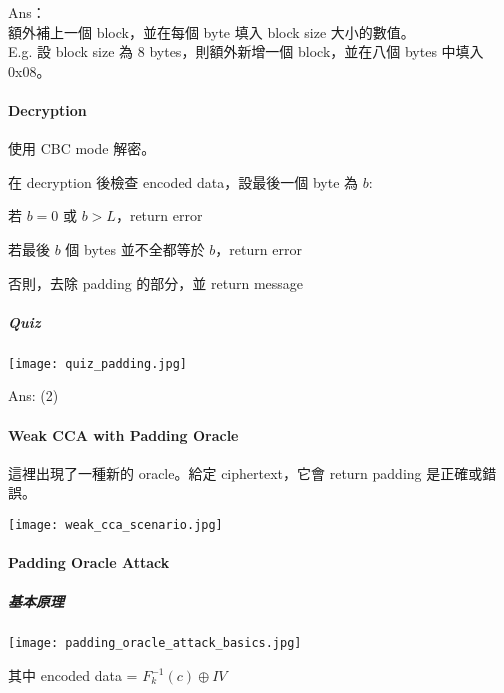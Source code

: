 Ans： \\
額外補上一個 block，並在每個 byte 填入 block size 大小的數值。 \\
E.g. 設 block size 為 8 bytes，則額外新增一個 block，並在八個 bytes 中填入 0x08。


\paragraph{Decryption}

使用 CBC mode 解密。 

在 decryption 後檢查 encoded data，設最後一個 byte 為 \(b\):
\begin{myItemize}
	\item 若 \(b = 0\) 或 \(b > L\)，return error
	\item 若最後 \(b\) 個 bytes 並不全都等於 \(b\)，return error
	\item 否則，去除 padding 的部分，並 return message
\end{myItemize}


\subparagraph{Quiz}

\begin{center}
	\texttt{[image: quiz\_padding.jpg]}
\end{center}

Ans: (2)


\paragraph{Weak CCA with Padding Oracle}

這裡出現了一種新的 oracle。給定 ciphertext，它會 return padding 是正確或錯誤。

\begin{center}
	\texttt{[image: weak\_cca\_scenario.jpg]}
\end{center}


\paragraph{Padding Oracle Attack}

\subparagraph{基本原理}

\begin{center}
	\texttt{[image: padding\_oracle\_attack\_basics.jpg]}
\end{center}

其中 encoded data = \(F_k^{-1}(c) \oplus IV\)

